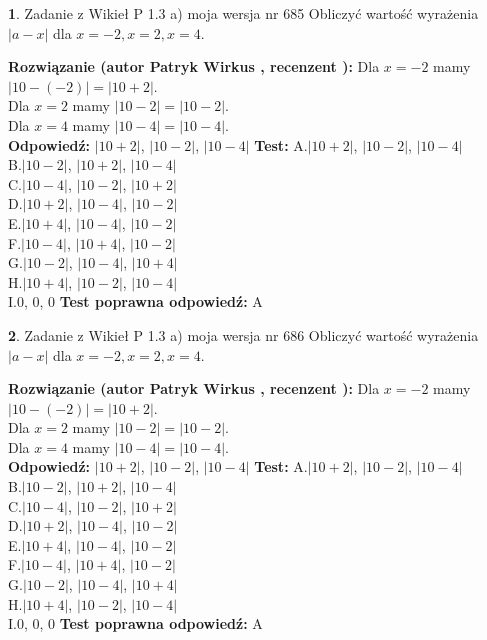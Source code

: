 \documentclass[12pt, a4paper]{article}
\theoremstyle{definition} %
\newtheorem{zad}{}
\newcommand{\zadStart}[1]{\begin{zad}#1\newline}
\newcommand{\zadStop}{\end{zad}}
\newcommand{\rozwStart}[2]{\noindent \textbf{Rozwiązanie (autor #1 , recenzent #2): }\newline}
\newcommand{\rozwStop}{\newline}
\newcommand{\odpStart}{\noindent \textbf{Odpowiedź:}\newline}
\newcommand{\odpStop}{\newline}
\newcommand{\testStart}{\noindent \textbf{Test:}\newline}
\newcommand{\testStop}{\newline}
\newcommand{\kluczStart}{\noindent \textbf{Test poprawna odpowiedź:}\newline}
\newcommand{\kluczStop}{\newline}
\begin{document}
\zadStart{Zadanie z Wikieł P 1.3 a) moja wersja nr 685}
Obliczyć wartość wyrażenia $|a - x|$ dla $x=-2,x=2,x=4$.
\zadStop
\rozwStart{Patryk Wirkus}{}
Dla $x = -2$ mamy $|10 - (-2)| = |10 + 2|$.\\
Dla $x = 2$ mamy $|10 - 2| = |10 - 2|$.\\
Dla $x = 4$ mamy $|10 - 4| = |10 - 4|$.\\
\rozwStop
\odpStart
$|10 + 2|$, $|10 - 2|$, $|10 - 4|$
\odpStop
\testStart
A.$|10 + 2|$, $|10 - 2|$, $|10 - 4|$\\
B.$|10 - 2|$, $|10 + 2|$, $|10 - 4|$\\
C.$|10 - 4|$, $|10 - 2|$, $|10 + 2|$\\
D.$|10 + 2|$, $|10 - 4|$, $|10 - 2|$\\
E.$|10 + 4|$, $|10 - 4|$, $|10 - 2|$\\
F.$|10 - 4|$, $|10 + 4|$, $|10 - 2|$\\
G.$|10 - 2|$, $|10 - 4|$, $|10 + 4|$\\
H.$|10 + 4|$, $|10 - 2|$, $|10 - 4|$\\
I.$0$, $0$, $0$
\testStop
\kluczStart
A
\kluczStop



\zadStart{Zadanie z Wikieł P 1.3 a) moja wersja nr 686}
Obliczyć wartość wyrażenia $|a - x|$ dla $x=-2,x=2,x=4$.
\zadStop
\rozwStart{Patryk Wirkus}{}
Dla $x = -2$ mamy $|10 - (-2)| = |10 + 2|$.\\
Dla $x = 2$ mamy $|10 - 2| = |10 - 2|$.\\
Dla $x = 4$ mamy $|10 - 4| = |10 - 4|$.\\
\rozwStop
\odpStart
$|10 + 2|$, $|10 - 2|$, $|10 - 4|$
\odpStop
\testStart
A.$|10 + 2|$, $|10 - 2|$, $|10 - 4|$\\
B.$|10 - 2|$, $|10 + 2|$, $|10 - 4|$\\
C.$|10 - 4|$, $|10 - 2|$, $|10 + 2|$\\
D.$|10 + 2|$, $|10 - 4|$, $|10 - 2|$\\
E.$|10 + 4|$, $|10 - 4|$, $|10 - 2|$\\
F.$|10 - 4|$, $|10 + 4|$, $|10 - 2|$\\
G.$|10 - 2|$, $|10 - 4|$, $|10 + 4|$\\
H.$|10 + 4|$, $|10 - 2|$, $|10 - 4|$\\
I.$0$, $0$, $0$
\testStop
\kluczStart
A
\kluczStop
\end{document}
